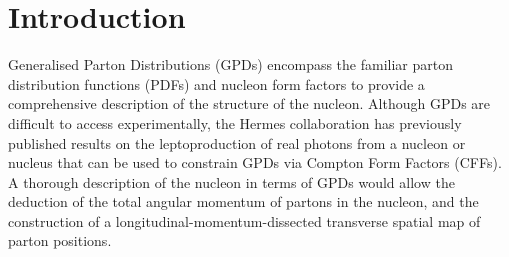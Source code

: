 \section{Introduction}
Generalised Parton Distributions (GPDs)
\cite{Mue94,Ji97a,Rad97} encompass the familiar parton
distribution functions (PDFs) and nucleon form factors to provide a
comprehensive description of the structure of the nucleon.
Although GPDs are difficult to access experimentally, the H{\sc ermes}
collaboration has previously published results
\cite{Air01,Air06,Air08,Air09,Air10, Air10a, Air10b, Air11} on
the leptoproduction of real photons from a nucleon or nucleus that can
be used to constrain GPDs via Compton Form Factors (CFFs). A thorough
description of the nucleon in terms of GPDs would allow the deduction
of the total angular momentum of partons in the nucleon, and the
construction of a longitudinal-momentum-dissected transverse spatial map of parton positions.

